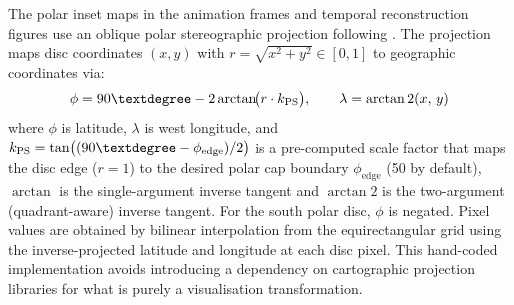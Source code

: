 The polar inset maps in the animation frames and temporal reconstruction figures use an oblique polar stereographic projection following \citet{Snyder1987}.  The projection maps disc coordinates $(x, y)$ with $r = \sqrt{x^2+y^2} \in [0,1]$ to geographic coordinates via:
\begin{equation}
  \phi = 90\textdegree - 2\arctan\!\bigl(r \cdot k_{\mathrm{PS}}\bigr), \qquad
  \lambda = \arctan2(x,\, y)
  \label{eq:polar_stereo}
\end{equation}
where $\phi$ is latitude, $\lambda$ is west longitude, and $k_{\mathrm{PS}} = \tan\bigl((90\textdegree - \phi_{\mathrm{edge}})/2\bigr)$ is a pre-computed scale factor that maps the disc edge ($r=1$) to the desired polar cap boundary $\phi_{\mathrm{edge}}$ (50\textdegree{} by default), $\arctan$ is the single-argument inverse tangent and $\arctan2$ is the two-argument (quadrant-aware) inverse tangent.  For the south polar disc, $\phi$ is negated.  Pixel values are obtained by bilinear interpolation from the equirectangular grid using the inverse-projected latitude and longitude at each disc pixel.  This hand-coded implementation avoids introducing a dependency on cartographic projection libraries for what is purely a visualisation transformation.
